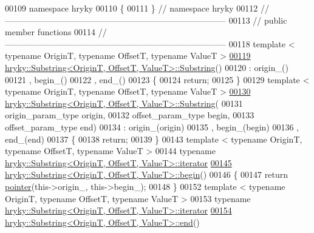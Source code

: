 \begin{DoxyCode}
00109 \textcolor{keyword}{namespace }hryky
00110 \{
00111 \} \textcolor{comment}{// namespace hryky}
00112 \textcolor{comment}{//
      ------------------------------------------------------------------------------}
00113 \textcolor{comment}{// public member functions}
00114 \textcolor{comment}{//
      ------------------------------------------------------------------------------}
00118 \textcolor{comment}{}\textcolor{keyword}{template} < \textcolor{keyword}{typename} OriginT, \textcolor{keyword}{typename} OffsetT, \textcolor{keyword}{typename} ValueT >
\hypertarget{substring_8h_source_l00119}{}\hyperlink{classhryky_1_1_substring_a6273165f234f5f2c064b8aafa495f945}{00119} \hyperlink{classhryky_1_1_substring_a6273165f234f5f2c064b8aafa495f945}{hryky::Substring<OriginT, OffsetT, ValueT>::Substring}()
00120     : origin\_()
00121       , begin\_()
00122       , end\_()
00123 \{
00124     \textcolor{keywordflow}{return};
00125 \}
00129 \textcolor{keyword}{template} < \textcolor{keyword}{typename} OriginT, \textcolor{keyword}{typename} OffsetT, \textcolor{keyword}{typename} ValueT >
\hypertarget{substring_8h_source_l00130}{}\hyperlink{classhryky_1_1_substring_a550a9df9a93d1de53572b2a11a716af5}{00130} \hyperlink{classhryky_1_1_substring}{hryky::Substring<OriginT, OffsetT, ValueT>::Substring}(
00131     origin\_param\_type origin,
00132     offset\_param\_type begin,
00133     offset\_param\_type end)
00134     : origin\_(origin)
00135       , begin\_(begin)
00136       , end\_(end)
00137 \{
00138     \textcolor{keywordflow}{return};
00139 \}
00143 \textcolor{keyword}{template} < \textcolor{keyword}{typename} OriginT, \textcolor{keyword}{typename} OffsetT, \textcolor{keyword}{typename} ValueT >
00144 \textcolor{keyword}{typename} \hyperlink{classhryky_1_1iterator_1_1random_1_1_mutable}{hryky::Substring<OriginT, OffsetT, ValueT>::iterator} 
\hypertarget{substring_8h_source_l00145}{}\hyperlink{classhryky_1_1_substring_a7d550a484228287b752fd562709b8981}{00145} \hyperlink{classhryky_1_1_substring}{hryky::Substring<OriginT, OffsetT, ValueT>::begin}()
00146 \{
00147     \textcolor{keywordflow}{return} \hyperlink{classhryky_1_1_offset_ptr}{pointer}(this->origin\_, this->begin\_);
00148 \}
00152 \textcolor{keyword}{template} < \textcolor{keyword}{typename} OriginT, \textcolor{keyword}{typename} OffsetT, \textcolor{keyword}{typename} ValueT >
00153 \textcolor{keyword}{typename} \hyperlink{classhryky_1_1iterator_1_1random_1_1_mutable}{hryky::Substring<OriginT, OffsetT, ValueT>::iterator} 
\hypertarget{substring_8h_source_l00154}{}\hyperlink{classhryky_1_1_substring_aa231be07658dfab51eb17900b57e4af3}{00154} \hyperlink{classhryky_1_1_substring}{hryky::Substring<OriginT, OffsetT, ValueT>::end}()

\end{DoxyCode}

